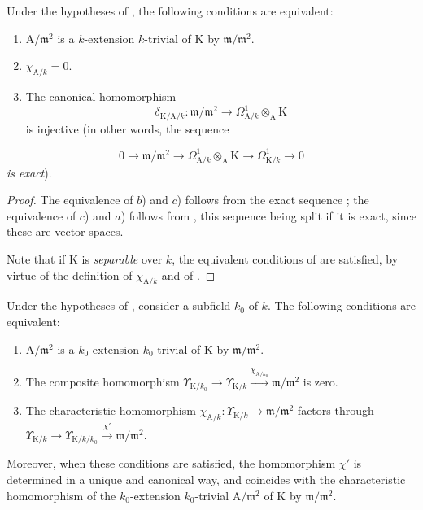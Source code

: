 \begin{proposition}[22.2.9]
\label{0.22.2.9}
Under the hypotheses of , the following conditions are equivalent:
\begin{enumerate}
  \item[a)] $\mathrm{A}/\mathfrak{m}^2$ is a $k$-extension $k$-trivial of $\mathrm{K}$ by $\mathfrak{m}/\mathfrak{m}^2$.
  \item[b)] $\chi_{\mathrm{A}/k}=0$.
  \item[c)] The canonical homomorphism 
  \[
    \delta_{\mathrm{K}/\mathrm{A}/k}:\mathfrak{m}/\mathfrak{m}^2\to\Omega^1_{\mathrm{A}/k}\otimes_\mathrm{A}\mathrm{K}
  \]
  is injective (in other words, the sequence
\end{enumerate}
\[
\label{0.22.2.9.1}
  0\to\mathfrak{m}/\mathfrak{m}^2\to\Omega^1_{\mathrm{A}/k}\otimes_\mathrm{A}\mathrm{K}\to\Omega^1_{\mathrm{K}/k}\to 0
  \tag{22.2.9.1}
\]
\emph{is exact}).
\end{proposition}

\begin{proof}
The equivalence of $b$) and $c$) follows from the exact sequence ; the equivalence of $c$) and $a$) follows from , this sequence being split if it is exact, since these are vector spaces.

Note that if $\mathrm{K}$ is \emph{separable} over $k$, the equivalent conditions of  are satisfied, by virtue of the definition of $\chi_{\mathrm{A}/k}$  and of .
\end{proof}

\begin{corollary}[22.2.10]
\label{0.22.2.10}
Under the hypotheses of , consider a subfield $k_0$ of $k$.
The following conditions are equivalent:
\begin{enumerate}
  \item[a)] $\mathrm{A}/\mathfrak{m}^2$ is a $k_0$-extension $k_0$-trivial of $\mathrm{K}$ by $\mathfrak{m}/\mathfrak{m}^2$.
  \item[b)] The composite homomorphism $\Upsilon_{\mathrm{K}/k_0}\to\Upsilon_{\mathrm{K}/k}\xrightarrow{\chi_{\mathrm{A}/k_0}}\mathfrak{m}/\mathfrak{m}^2$ is zero.
  \item[c)] The characteristic homomorphism $\chi_{\mathrm{A}/k}:\Upsilon_{\mathrm{K}/k}\to\mathfrak{m}/\mathfrak{m}^2$ factors through $\Upsilon_{\mathrm{K}/k}\to\Upsilon_{\mathrm{K}/k/k_0}\xrightarrow{\chi'}\mathfrak{m}/\mathfrak{m}^2$.
\end{enumerate}
Moreover, when these conditions are satisfied, the homomorphism $\chi'$ is determined in a unique and canonical way, and coincides with the characteristic homomorphism of the $k_0$-extension $k_0$-trivial $\mathrm{A}/\mathfrak{m}^2$ of $\mathrm{K}$ by $\mathfrak{m}/\mathfrak{m}^2$.
\end{corollary}


